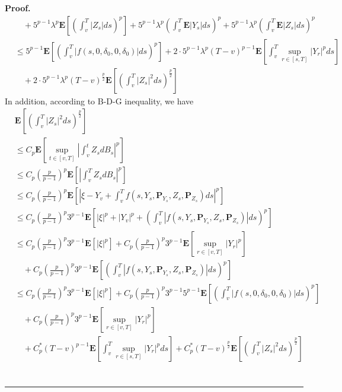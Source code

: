 \documentclass[10pt]{article}%
\numberwithin{equation}{section}
\newenvironment{proof}[1][Proof]{\noindent \textbf{#1.} }{\  \rule{0.5em}{0.5em}}
\begin{document}
\begin{proof}
\begin{align*}
    &\quad+5^{p-1}\lambda^p\mathbf{E}\left[\left(\int_{v}^{T}\left|Z_s\right|ds\right)^p\right]+5^{p-1}\lambda^p\left(\int_{v}^{T}\mathbf{E}\left|Y_s\right|ds\right)^p+5^{p-1}\lambda^p\left(\int_{v}^{T}\mathbf{E}\left|Z_s\right|ds\right)^p\\
    &\leq 5^{p-1}\mathbf{E}\left[\left(\int_{v}^{T}\left|f(s,0, \delta_0,0,\delta_0)\right|ds\right)^p\right]+2\cdot 5^{p-1}\lambda^p(T-v)^{p-1}\mathbf{E}\left[\int_{v}^{T}\sup_{r\in[s,T]}|Y_r|^pds\right]\\
    &\quad + 2\cdot 5^{p-1}\lambda^p(T-v)^{\frac{p}{2}}\mathbf{E}\left[\left(\int_{v}^{T}|Z_s|^2ds\right)^{\frac{p}{2}}\right]
\end{align*}
In addition, according to B-D-G inequality, we have 
\begin{align*}
&\mathbf{E}\left[\left(\int_{v}^{T}|Z_s|^2ds\right)^{\frac{p}{2}}\right]\\
& \leq C_{p}\mathbf{E}\left[\sup_{t\in[v,T]}\left|\int_{v}^{t}Z_sdB_s\right|^p\right]\\
&\leq C_{p}\left(\frac{p}{p-1}\right)^p\mathbf{E}\left[\left|\int_{v}^{T}Z_sdB_s\right|^p\right]\\
&\leq C_{p}\left(\frac{p}{p-1}\right)^p\mathbf{E}\left[\left|\xi-Y_v+\int_{v}^{T}f(s,Y_s,\mathbf{P}_{Y_s},Z_s,\mathbf{P}_{Z_s})ds\right|^p\right]\\
&\leq C_{p}\left(\frac{p}{p-1}\right)^p 3^{p-1}\mathbf{E}\left[\left|\xi\right|^p+\left|Y_v\right|^p+\left(\int_{v}^{T}\left|f(s,Y_s, \mathbf{P}_{Y_s},Z_s,\mathbf{P}_{Z_s})\right|ds\right)^p\right]\\
&\leq  C_{p}\left(\frac{p}{p-1}\right)^p 3^{p-1}\mathbf{E}\left[\left|\xi\right|^p\right]+ C_{p}\left(\frac{p}{p-1}\right)^p 3^{p-1}\mathbf{E}\left[\sup_{r\in[v,T]}\left|Y_r\right|^p\right]\\
&\quad+ C_{p}\left(\frac{p}{p-1}\right)^p 3^{p-1}\mathbf{E}\left[\left(\int_{v}^{T}\left|f(s,Y_s, \mathbf{P}_{Y_s},Z_s,\mathbf{P}_{Z_s})\right|ds\right)^p\right]\\
&\leq C_{p}\left(\frac{p}{p-1}\right)^p 3^{p-1}\mathbf{E}\left[\left|\xi\right|^p\right]+C_{p}\left(\frac{p}{p-1}\right)^p 3^{p-1}5^{p-1}\mathbf{E}\left[\left(\int_{v}^{T}\left|f(s,0, \delta_0,0,\delta_0)\right|ds\right)^p\right]\\
&\quad+C_{p}\left(\frac{p}{p-1}\right)^p 3^{p-1}\mathbf{E}\left[\sup_{r\in[v,T]}\left|Y_r\right|^p\right]\\
&\quad +C_{p}^{*}(T-v)^{p-1}\mathbf{E}\left[\int_{v}^{T}\sup_{r\in[s,T]}|Y_r|^pds\right]+ C_{p}^{*}(T-v)^{\frac{p}{2}}\mathbf{E}\left[\left(\int_{v}^{T}|Z_s|^2ds\right)^{\frac{p}{2}}\right]\\

\end{align*}
\end{proof}
\end{document}
